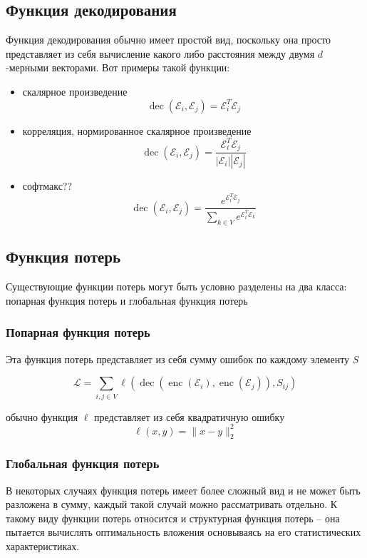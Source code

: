 \documentclass[12pt,a4paper]{extarticle}
\newcommand{\E}{\mathcal{E}}
\newcommand{\Loss}{\mathcal{L}}
\newcommand{\encoder}{\operatorname{enc}}
\newcommand{\decoder}{\operatorname{dec}}
\begin{document}
    \subsection{Функция декодирования}
    Функция декодирования обычно имеет простой вид, поскольку она просто представляет из себя вычисление какого либо расстояния между двумя $d$-мерными векторами. Вот примеры такой функции:
    \begin{itemize}
        \item скалярное произведение
            \[\decoder(\E_i, \E_j) = \E_i^T\E_j\]
        \item корреляция, нормированное скалярное произведение
            \[\decoder(\E_i, \E_j) =  \frac{\E_i^T\E_j}{|\E_i||\E_j|} \]
        \item софтмакс??
            \[\decoder(\E_i, \E_j) = \frac{e^{\E_i^T\E_j}}{\sum_{k \in V} e^{\E_i^T\E_k}}\]
    \end{itemize}
    
    \subsection{Функция потерь}
    Существующие функции потерь могут быть условно разделены на два класса: попарная функция потерь и глобальная функция потерь
    
    \subsubsection{Попарная функция потерь}
    Эта функция потерь представляет из себя сумму ошибок по каждому элементу $S$
    
    \[\Loss = \sum_{i, j \in V} \ell (\decoder(\encoder(\E_i), \encoder(\E_j)), S_{ij}) \]
    
    обычно функция $\ell$ представляет из себя квадратичную ошибку 
    \[\ell(x, y) = \lVert x - y \rVert_2^2 \]
    
    \subsubsection{Глобальная функция потерь}
    В некоторых случаях функция потерь имеет более сложный вид и не может быть разложена в сумму, каждый такой случай можно рассматривать отдельно. К такому виду функции потерь относится и структурная функция потерь -- она пытается вычислять оптимальность вложения основываясь на его статистических характеристиках.

    
    
\end{document}
